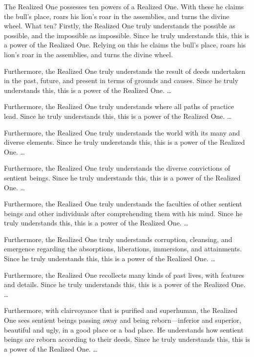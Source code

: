 \documentclass[12pt,openany]{book}%
\begin{document}
The Realized One possesses ten powers of a Realized One. With these he claims the bull’s place, roars his lion’s roar in the assemblies, and turns the divine wheel. What ten? Firstly, the Realized One truly understands the possible as possible, and the impossible as impossible. Since he truly understands this, this is a power of the Realized One. Relying on this he claims the bull’s place, roars his lion’s roar in the assemblies, and turns the divine wheel. 

Furthermore, the Realized One truly understands the result of deeds undertaken in the past, future, and present in terms of grounds and causes. Since he truly understands this, this is a power of the Realized One. … 

Furthermore, the Realized One truly understands where all paths of practice lead. Since he truly understands this, this is a power of the Realized One. … 

Furthermore, the Realized One truly understands the world with its many and diverse elements. Since he truly understands this, this is a power of the Realized One. … 

Furthermore, the Realized One truly understands the diverse convictions of sentient beings. Since he truly understands this, this is a power of the Realized One. … 

Furthermore, the Realized One truly understands the faculties of other sentient beings and other individuals after comprehending them with his mind. Since he truly understands this, this is a power of the Realized One. … 

Furthermore, the Realized One truly understands corruption, cleansing, and emergence regarding the absorptions, liberations, immersions, and attainments. Since he truly understands this, this is a power of the Realized One. … 

Furthermore, the Realized One recollects many kinds of past lives, with features and details. Since he truly understands this, this is a power of the Realized One. … 

Furthermore, with clairvoyance that is purified and superhuman, the Realized One sees sentient beings passing away and being reborn—inferior and superior, beautiful and ugly, in a good place or a bad place. He understands how sentient beings are reborn according to their deeds. Since he truly understands this, this is a power of the Realized One. … 
\end{document}
